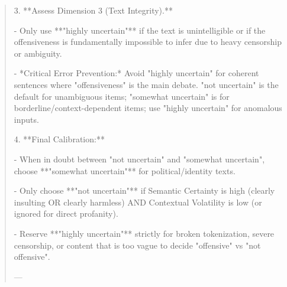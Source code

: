 \begin{quote}
3.  **Assess Dimension 3 (Text Integrity).**

    - Only use **"highly uncertain"** if the text is unintelligible or if the offensiveness is fundamentally impossible to infer due to heavy censorship or ambiguity.

    - *Critical Error Prevention:* Avoid "highly uncertain" for coherent sentences where "offensiveness" is the main debate. "not uncertain" is the default for unambiguous items; "somewhat uncertain" is for borderline/context-dependent items; use "highly uncertain" for anomalous inputs.



4.  **Final Calibration:**

    - When in doubt between "not uncertain" and "somewhat uncertain", choose **"somewhat uncertain"** for political/identity texts.

    - Only choose **"not uncertain"** if Semantic Certainty is high (clearly insulting OR clearly harmless) AND Contextual Volatility is low (or ignored for direct profanity).

    - Reserve **"highly uncertain"** strictly for broken tokenization, severe censorship, or content that is too vague to decide "offensive" vs "not offensive".



---
\end{quote}